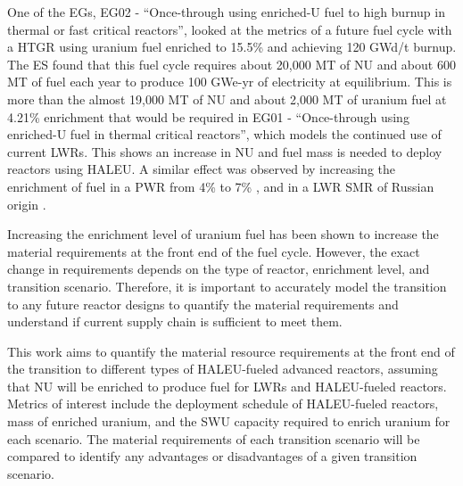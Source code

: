 One of the \glspl{EG}, \gls{EG}02 - ``Once-through using enriched-U fuel to 
high burnup in thermal or fast critical reactors'', looked at the metrics 
of a future fuel cycle with a \gls{HTGR} using uranium fuel enriched to 
15.5\% and achieving 120 GWd/t burnup. The \gls{ES} found that this fuel cycle
requires about 20,000 MT of \gls{NU} and about 600 MT of fuel each year 
to produce 100 GWe-yr of electricity at equilibrium. This is more than the 
almost 19,000 MT of \gls{NU} and about 2,000 MT of uranium fuel at 4.21\%
enrichment that would be required in \gls{EG}01 - ``Once-through using enriched-U 
fuel in thermal critical reactors'', which models the continued use of current 
\glspl{LWR}. This shows an increase in \gls{NU} and fuel mass is needed to 
deploy reactors using \gls{HALEU}.
A similar effect was observed by increasing the enrichment of fuel in a 
\gls{PWR} from 4\% to 7\% \cite{burns_reactor_2020}, and in a \gls{LWR}
\gls{SMR} of Russian origin \cite{hernandez_potential_2020}. 

Increasing the enrichment level of uranium fuel has been shown to 
increase the material requirements at the front end of 
the fuel cycle. However, the exact change in requirements depends 
on the type of reactor, enrichment level, and transition scenario.
Therefore, it is important to accurately model the transition to any future
reactor designs to quantify the material requirements and understand
if current supply chain is sufficient to meet them. 

This work aims to quantify the material resource requirements at the front 
end of the 
transition to different types of \gls{HALEU}-fueled advanced reactors, 
assuming that \gls{NU} will be enriched to produce fuel for \glspl{LWR} and 
\gls{HALEU}-fueled reactors. 
Metrics of interest include the deployment schedule of \gls{HALEU}-fueled 
reactors, mass of enriched uranium, and the \gls{SWU} capacity required to 
enrich uranium for each scenario. The material requirements of each transition 
scenario will be compared to identify any advantages or disadvantages of 
a given transition scenario. 
